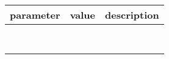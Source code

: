 
  \centering
  \begin{tabular}{|c|c|c|}
    \hline
    parameter & value & description \\
    \hline
     \\
    \hline
     \\
    \hline
     \\
    \hline
     \\
    \hline 
     \\
    \hline
     \\
    \hline
     \\
    \hline
     \\
    \hline
  \end{tabular}

